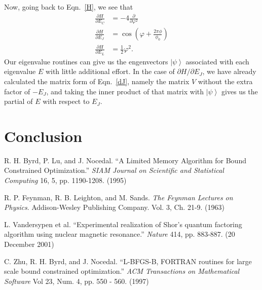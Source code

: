 \documentclass[twocolumn]{revtex4}
\newcommand{\ket}[1]{\left| #1 \right>}
\begin{document}
Now, going back to Eqn.~\ref{H}, we see that
\begin{align}
  \label{dC}
  \frac{\partial H}{\partial E_C} &= -4\frac{\partial}{\partial
    \varphi^2}\\
  \label{dJ}
  \frac{\partial H}{\partial E_J} &= \cos(\varphi +
  \frac{2\pi\phi}{\phi_0})\\
  \label{dL}
  \frac{\partial H}{\partial E_L} &= \frac{1}{2}\varphi^2.
\end{align}
Our eigenvalue routines can give us the engenvectors $\ket{\psi}$
associated with each eigenvalue $E$ with little additional effort. In
the case of $\partial H/\partial E_J$, we have already calculated the
matrix form of Eqn.~\ref{dJ}, namely the matrix $V$ without the extra
factor of $-E_J$, and taking the inner product of that matrix with
$\ket{\psi}$ gives us the partial of $E$ with respect to $E_J$.


\section{Conclusion}



\begin{thebibliography}{9}
 R. H. Byrd, P. Lu, and J. Nocedal. ``A Limited Memory
  Algorithm for Bound Constrained Optimization.'' \textit{SIAM Journal
    on Scientific and Statistical Computing} 16, 5,
  pp. 1190-1208. (1995)
  
 R. P. Feynman, R. B. Leighton, and
  M. Sands. \textit{The Feynman Lectures on Physics}. Addison-Wesley
  Publishing Company. Vol. 3, Ch. 21-9. (1963)

 L. Vandersypen et al. ``Experimental realization
  of Shor's quantum factoring algorithm using nuclear magnetic
  resonance.'' \textit{Nature} 414, pp. 883-887. (20 December 2001)
  
 C. Zhu, R. H. Byrd, and J. Nocedal. ``L-BFGS-B, FORTRAN
  routines for large scale bound constrained optimization.''
  \textit{ACM Transactions on Mathematical Software} Vol 23, Num. 4,
  pp. 550 - 560. (1997)

\end{thebibliography}
\end{document}
